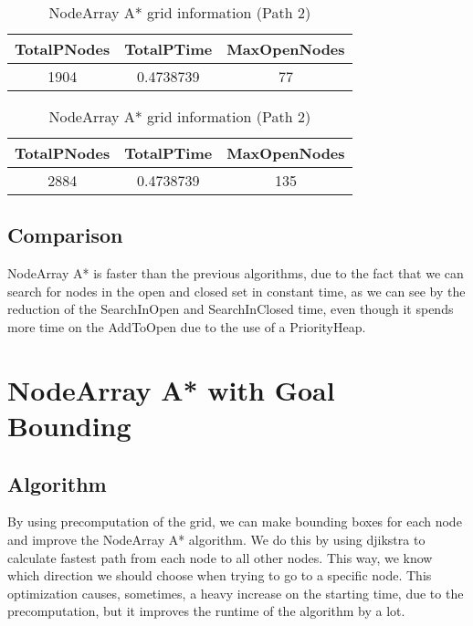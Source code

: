 \documentclass{article}
\begin{document}
  \begin{table}[h!]
    \parbox{.45\linewidth}{
        \centering
        \caption{NodeArray A* grid information (Path 1)}
        \label{tab:tableNodeArrayGrid1}
        \begin{tabular}{c|c|c}
          \textbf{TotalPNodes} & \textbf{TotalPTime} & \textbf{MaxOpenNodes}\\
          \hline
          1904 & 0.4738739 & 77\\
        \end{tabular}
    }
    \hfil
    \parbox{.45\linewidth}{
        \centering
        \caption{NodeArray A* grid information (Path 2)}
        \label{tab:tableNodeArrayGrid2}
        \begin{tabular}{c|c|c}
          \textbf{TotalPNodes} & \textbf{TotalPTime} & \textbf{MaxOpenNodes}\\
          \hline
          2884 & 0.4738739 & 135\\
        \end{tabular}
    }
  \end{table}

  \subsection{Comparison}
  NodeArray A* is faster than the previous algorithms, due to the fact that we can search for nodes in the open and closed set in constant time,
  as we can see by the reduction of the SearchInOpen and SearchInClosed time, even though it spends more time on the AddToOpen due to the use of a PriorityHeap.\\

  \section{NodeArray A* with Goal Bounding}
  \subsection{Algorithm}
  By using precomputation of the grid, we can make bounding boxes for each node and improve the NodeArray A* algorithm. We do this by using djikstra to
  calculate fastest path from each node to all other nodes. This way, we know which direction we should choose when trying to go to a specific node.
  This optimization causes, sometimes, a heavy increase on the starting time, due to the precomputation, but it improves the runtime of the algorithm by a lot.\\ 
\end{document}
